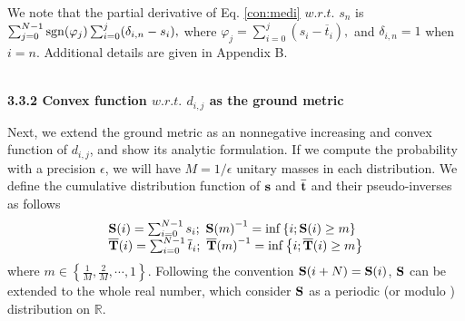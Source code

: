 We note that the partial derivative of Eq. \eqref{con:medi} $w.r.t.$ $s_n$ is $\sum_{j=0}^{N-1}{\rm{sgn}}(\varphi_j)\sum_{i=0}^{j}(\delta_{i,n}-s_i),$ where $\varphi_j=\sum_{i=0}^{j}(s_i-{\overline{t}_i}),$ and $\delta_{i,n}=1$ when $i=n$. Additional details are given in Appendix B.



















~\\
\noindent\textbf{3.3.2 Convex function $ w.r.t.$ $d_{i,j}$ as the ground metric}

Next, we extend the ground metric as an nonnegative increasing and convex function of $d_{i,j}$, and show its analytic formulation. If we compute the probability with a precision $\epsilon$, we will have $M=1/\epsilon$ unitary masses in each distribution. We define the cumulative distribution function of ${\rm{\textbf{s}}}$ and ${\overline{\rm\textbf{t}}}$ and their pseudo-inverses as follows \begin{equation}
\begin{array}{ll}
{\rm{\textbf{S}}}(i)=\sum_{i=0}^{N-1}s_i; ~{\rm{\textbf{S}}}{(m)}^{-1}={\rm{inf}}\left\{i; {\rm{\textbf{S}}}(i)\geq m\right\}\\



{\rm\overline{\textbf{T}}}(i)=\sum_{i=0}^{N-1}\overline{t}_i; ~{\rm\overline{\textbf{T}}}{(m)}^{-1}={\rm{inf}}\left\{i; {\rm\overline{\textbf{T}}}(i)\geq m\right\}\\
             \end{array}
\end{equation} where $m\in \left\{\frac{1}{M},\frac{2}{M},\cdots,1\right\}$. Following the convention ${\rm{\textbf{S}}}(i+N)={\rm{\textbf{S}}}(i)$, ${\rm{\textbf{S}}}$ can be extended to the whole real number, which consider ${\rm{\textbf{S}}}$ as a periodic (or modulo \cite{cha2002measuring}) distribution on $\mathbb{R}$. 




